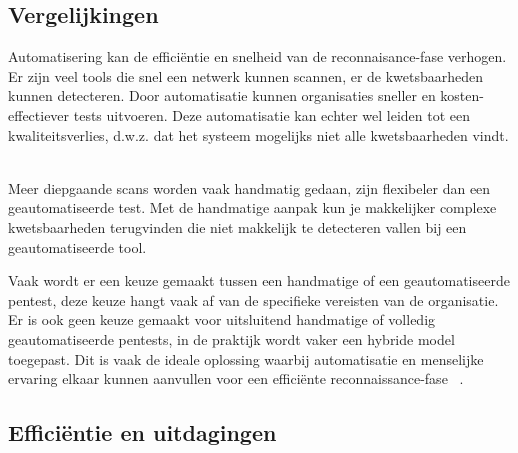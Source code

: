 \subsection{Vergelijkingen}

Automatisering kan de efficiëntie en snelheid van de reconnaisance-fase verhogen. Er zijn veel tools die snel een netwerk kunnen scannen, 
er de kwetsbaarheden kunnen detecteren. Door automatisatie kunnen 
organisaties sneller en kosten-effectiever tests uitvoeren. Deze automatisatie kan echter wel leiden tot een kwaliteitsverlies, 
d.w.z. dat het systeem mogelijks niet alle kwetsbaarheden vindt. ~\autocite{peris}

Meer diepgaande scans worden vaak handmatig gedaan, zijn flexibeler dan een geautomatiseerde test. 
Met de handmatige aanpak kun je makkelijker complexe kwetsbaarheden terugvinden die niet makkelijk te detecteren vallen bij 
een geautomatiseerde tool.~\autocite{techtarget} 

Vaak wordt er een keuze gemaakt tussen een handmatige of een geautomatiseerde pentest, deze keuze hangt vaak af van de specifieke  
vereisten van de organisatie. Er is ook geen keuze gemaakt voor uitsluitend handmatige of volledig geautomatiseerde pentests, in de praktijk wordt vaker een hybride model toegepast.
Dit is vaak de ideale oplossing waarbij automatisatie en menselijke ervaring elkaar kunnen 
aanvullen voor een efficiënte reconnaissance-fase ~\autocite{techtarget}.

\subsection{Efficiëntie en uitdagingen}


